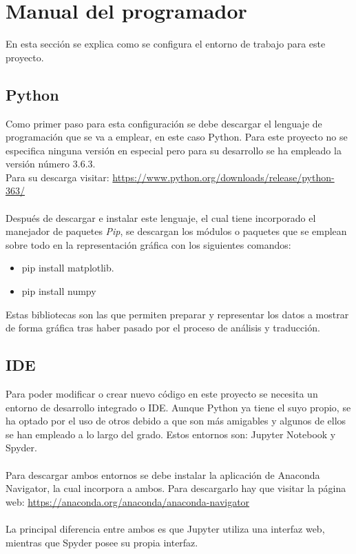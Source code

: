 \section{Manual del programador}
En esta sección se explica como se configura el entorno de trabajo para este proyecto.
\subsection{Python}
Como primer paso para esta configuración se debe descargar el lenguaje de programación que se va a emplear, en este caso Python. Para este proyecto no se especifica ninguna versión en especial pero para su desarrollo se ha empleado la versión número 3.6.3.\\
Para  su descarga visitar: \url{https://www.python.org/downloads/release/python-363/}\\
\\
Después de descargar e instalar este lenguaje, el cual tiene incorporado el manejador de paquetes \textit{Pip}, se descargan los módulos o paquetes que se emplean sobre todo en la representación gráfica con los siguientes comandos:
\begin{itemize}
	\item pip install matplotlib.
	\item pip install numpy
\end{itemize}
Estas bibliotecas son las que permiten preparar y representar los datos a mostrar de forma gráfica tras haber pasado por el proceso de análisis y traducción.\\

\subsection{IDE}
Para poder modificar o crear nuevo código en este proyecto se necesita un entorno de desarrollo integrado o IDE. Aunque Python ya tiene el suyo propio, se ha optado por el uso de otros debido a que son más amigables y algunos de ellos se han empleado a lo largo del grado. Estos entornos son: Jupyter Notebook y Spyder.\\
\\
Para descargar ambos entornos se debe instalar la aplicación de Anaconda Navigator, la cual incorpora a ambos. Para descargarlo hay que visitar la página web: \url{https://anaconda.org/anaconda/anaconda-navigator} \\
\\
La principal diferencia entre ambos es que Jupyter utiliza una interfaz web, mientras que Spyder posee su propia interfaz.\\

